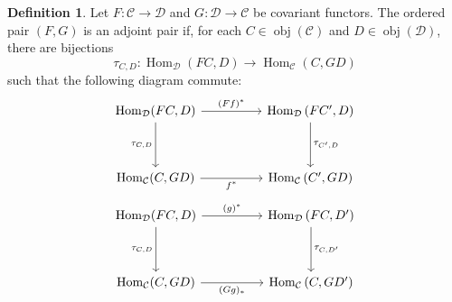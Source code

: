 \documentclass[a4paper,12pt]{article}
\theoremstyle{definition}
\newtheorem{defn}{Definition}[subsection]
\begin{document}
\begin{defn}
    Let $F: \mathcal{C} \rightarrow \mathcal{D}$ and $G: \mathcal{D} \rightarrow \mathcal{C}$ be covariant functors. The ordered pair $(F, G)$ is an adjoint pair if, for each $C \in \operatorname{obj}(\mathcal{C})$ and $D \in \operatorname{obj}(\mathcal{D})$, there are bijections
    $$
        \tau_{C, D}: \operatorname{Hom}_{\mathcal{D}}(F C, D) \rightarrow \operatorname{Hom}_{\mathcal{C}}(C, G D)
    $$
    such that the following diagram commute:
    \[\begin{tikzcd}
            {\operatorname{Hom}_{\mathcal{D}}(F C, D)} && { \operatorname{Hom}_{\mathcal{D}}\left(F C^{\prime}, D\right)} \\
            \\
            {\operatorname{Hom}_{\mathcal{C}}(C, G D) } && {\operatorname{Hom}_{\mathcal{C}}\left(C^{\prime}, G D\right)}
            \arrow["{(F f)^*}", from=1-1, to=1-3]
            \arrow["{\tau_{C,D}}"', from=1-1, to=3-1]
            \arrow["{f^{*}}"', from=3-1, to=3-3]
            \arrow["{\tau_{C^{\prime},D}}", from=1-3, to=3-3]
        \end{tikzcd}\]
    \[\begin{tikzcd}
            {\operatorname{Hom}_{\mathcal{D}}(F C, D)} && { \operatorname{Hom}_{\mathcal{D}}\left(F C, D^{\prime}\right)} \\
            \\
            {\operatorname{Hom}_{\mathcal{C}}(C, G D) } && {\operatorname{Hom}_{\mathcal{C}}\left(C, G D^{\prime}\right)}
            \arrow["{(g)^*}", from=1-1, to=1-3]
            \arrow["{\tau_{C,D}}"', from=1-1, to=3-1]
            \arrow["{(Gg)_{*}}"', from=3-1, to=3-3]
            \arrow["{\tau_{C,D^{\prime}}}", from=1-3, to=3-3]
        \end{tikzcd}\]
\end{defn}
\end{document}
